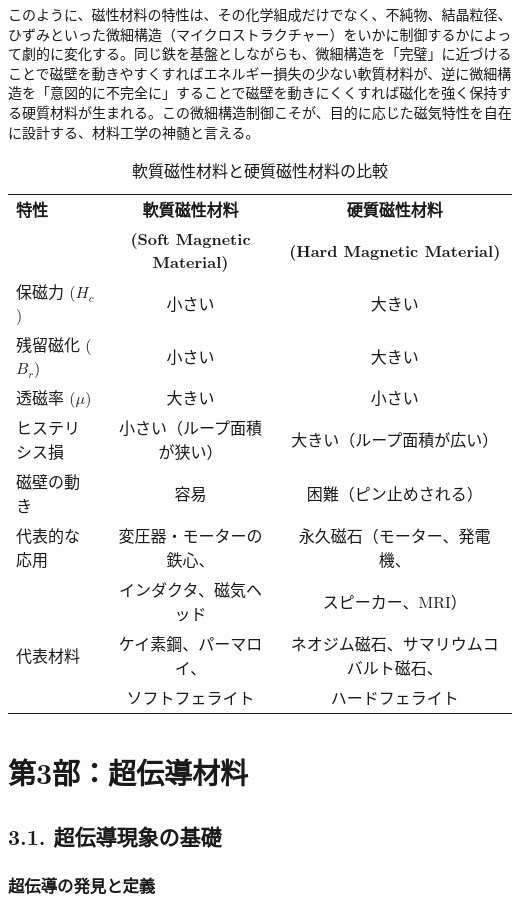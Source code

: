 \documentclass[11pt,a4paper]{ltjsarticle}
\begin{document}
このように、磁性材料の特性は、その化学組成だけでなく、不純物、結晶粒径、ひずみといった微細構造（マイクロストラクチャー）をいかに制御するかによって劇的に変化する。同じ鉄を基盤としながらも、微細構造を「完璧」に近づけることで磁壁を動きやすくすればエネルギー損失の少ない軟質材料が、逆に微細構造を「意図的に不完全に」することで磁壁を動きにくくすれば磁化を強く保持する硬質材料が生まれる。この微細構造制御こそが、目的に応じた磁気特性を自在に設計する、材料工学の神髄と言える。

\begin{table}[h]
\centering
\caption{軟質磁性材料と硬質磁性材料の比較}
\begin{tabular}{lcc}
\toprule
\textbf{特性} & \textbf{軟質磁性材料} & \textbf{硬質磁性材料} \\
 & \textbf{(Soft Magnetic Material)} & \textbf{(Hard Magnetic Material)} \\
\midrule
保磁力 ($H_c$) & 小さい & 大きい \\
残留磁化 ($B_r$) & 小さい & 大きい \\
透磁率 ($\mu$) & 大きい & 小さい \\
ヒステリシス損 & 小さい（ループ面積が狭い） & 大きい（ループ面積が広い） \\
磁壁の動き & 容易 & 困難（ピン止めされる） \\
代表的な応用 & 変圧器・モーターの鉄心、 & 永久磁石（モーター、発電機、 \\
 & インダクタ、磁気ヘッド & スピーカー、MRI） \\
代表材料 & ケイ素鋼、パーマロイ、 & ネオジム磁石、サマリウムコバルト磁石、 \\
 & ソフトフェライト & ハードフェライト \\
\bottomrule
\end{tabular}
\end{table}

\section*{第3部：超伝導材料}

\subsection*{3.1. 超伝導現象の基礎}

\subsubsection*{超伝導の発見と定義}
\end{document}
